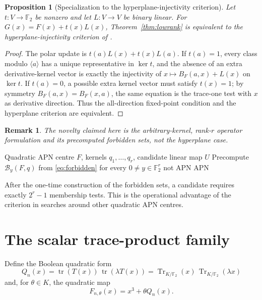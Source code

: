 \documentclass[pdflatex,sn-mathphys-num]{sn-jnl}
\theoremstyle{thmstyleone}
\newtheorem{proposition}[theorem]{Proposition}
\theoremstyle{thmstyletwo}
\newtheorem{remark}[theorem]{Remark}
\theoremstyle{thmstylethree}
\newcommand{\F}{\mathbb F}
\newcommand{\Tr}{\operatorname{Tr}}
\newcommand{\tr}{\operatorname{tr}}
\newcommand{\cB}{\mathcal B}
\begin{document}
\begin{proposition}[Specialization to the hyperplane-injectivity criterion]\label{prop:hequiv}
Let $t:V\to\F_2$ be nonzero and let $L:V\to V$ be binary linear. For $G(x)=F(x)+t(x)L(x)$, Theorem~\ref{thm:lowrank} is equivalent to the hyperplane-injectivity criterion of \cite{TaniguchiEtAl2025}.
\end{proposition}
\begin{proof}
The polar update is $t(a)L(x)+t(x)L(a)$. If $t(a)=1$, every class modulo $\langle a\rangle$ has a unique representative in $\ker t$, and the absence of an extra derivative-kernel vector is exactly the injectivity of $x\mapsto B_F(a,x)+L(x)$ on $\ker t$. If $t(a)=0$, a possible extra kernel vector must satisfy $t(x)=1$; by symmetry $B_F(a,x)=B_F(x,a)$, the same equation is the trace-one test with $x$ as derivative direction. Thus the all-direction fixed-point condition and the hyperplane criterion are equivalent.
\end{proof}
\begin{remark}
The novelty claimed here is the arbitrary-kernel, rank-$r$ operator formulation and its precomputed forbidden sets, not the hyperplane case.
\end{remark}

\begin{algorithm}[ht]
\caption{Testing a low-rank update after precomputation}\label{alg:forbidden}
\begin{algorithmic}[1]
\Require Quadratic APN centre $F$, kernels $q_1,\ldots,q_r$, candidate linear map $U$
\State Precompute $\cB_y(F,q)$ from \eqref{eq:forbidden} for every $0\ne y\in\F_2^r$
\For{$0\ne y\in\F_2^r$}
  \If{$U(y)\in\cB_y(F,q)$} \State \Return not APN \EndIf
\EndFor
\State \Return APN
\end{algorithmic}
\end{algorithm}
After the one-time construction of the forbidden sets, a candidate requires exactly $2^r-1$ membership tests. This is the operational advantage of the criterion in searches around other quadratic APN centres.

\section{The scalar trace-product family}\label{sec:family}

Define the Boolean quadratic form
\begin{equation}\label{eq:Qdef}
 Q_n(x)=\tr(T(x))\,\tr(\lambda T(x))
       =\Tr_{K/\F_2}(x)\,\Tr_{K/\F_2}(\lambda x)
\end{equation}
and, for $\theta\in K$, the quadratic map
\begin{equation}\label{eq:Ftheta}
 F_{n,\theta}(x)=x^3+\theta Q_n(x).
\end{equation}
\end{document}
